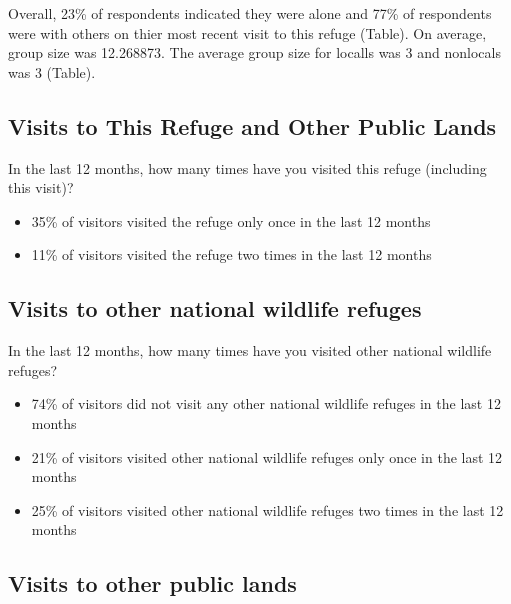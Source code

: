 \documentclass[]{book}
\providecommand{\tightlist}{%
  \setlength{\itemsep}{0pt}\setlength{\parskip}{0pt}}
\begin{document}
Overall, 23\% of respondents indicated they were alone and 77\% of
respondents were with others on thier most recent visit to this refuge
(Table). On average, group size was 12.268873. The average group size
for localls was 3 and nonlocals was 3 (Table).

\subsection*{Visits to This Refuge and Other Public
Lands}\label{visits-to-this-refuge-and-other-public-lands}

In the last 12 months, how many times have you visited this refuge
(including this visit)?

\begin{itemize}
\tightlist
\item
  35\% of visitors visited the refuge only once in the last 12 months
\item
  11\% of visitors visited the refuge two times in the last 12 months
\end{itemize}

\subsection*{Visits to other national wildlife
refuges}\label{visits-to-other-national-wildlife-refuges}

In the last 12 months, how many times have you visited other national
wildlife refuges?

\begin{itemize}
\tightlist
\item
  74\% of visitors did not visit any other national wildlife refuges in
  the last 12 months
\item
  21\% of visitors visited other national wildlife refuges only once in
  the last 12 months
\item
  25\% of visitors visited other national wildlife refuges two times in
  the last 12 months
\end{itemize}

\subsection*{Visits to other public
lands}\label{visits-to-other-public-lands}
\end{document}
